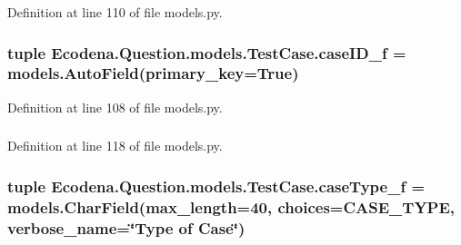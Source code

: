 Definition at line 110 of file models.py.

\hypertarget{class_ecodena_1_1_question_1_1models_1_1_test_case_a9448c3b3b6da8aba864e4b8bec30bb17}{
\subsubsection[{caseID\_\-f}]{\setlength{\rightskip}{0pt plus 5cm}tuple {\bf Ecodena.Question.models.TestCase.caseID\_\-f} = models.AutoField(primary\_\-key=True)}}
\label{d4/d96/class_ecodena_1_1_question_1_1models_1_1_test_case_a9448c3b3b6da8aba864e4b8bec30bb17}


Definition at line 108 of file models.py.

\hypertarget{class_ecodena_1_1_question_1_1models_1_1_test_case_ae271617c1377ad90ebc7227e91f0d0ee}{
\subsubsection[{caseID\_\-f}]{}}
\label{d4/d96/class_ecodena_1_1_question_1_1models_1_1_test_case_ae271617c1377ad90ebc7227e91f0d0ee}


Definition at line 118 of file models.py.

\hypertarget{class_ecodena_1_1_question_1_1models_1_1_test_case_a0fc9e08f3ccdc4e9590f7778eb685ba8}{
\subsubsection[{caseType\_\-f}]{\setlength{\rightskip}{0pt plus 5cm}tuple {\bf Ecodena.Question.models.TestCase.caseType\_\-f} = models.CharField(max\_\-length=40, choices={\bf CASE\_\-TYPE}, verbose\_\-name=\char`\"{}Type of Case\char`\"{})}}
\label{d4/d96/class_ecodena_1_1_question_1_1models_1_1_test_case_a0fc9e08f3ccdc4e9590f7778eb685ba8}


